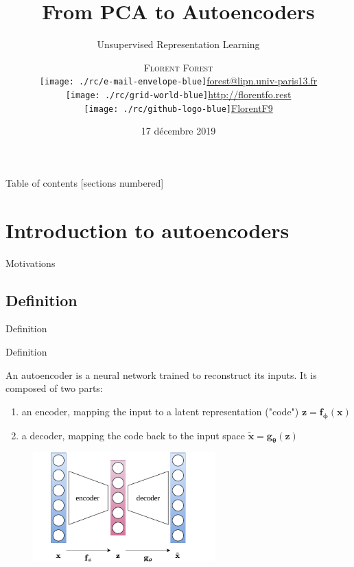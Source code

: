 \documentclass{beamer}
\title{From PCA to Autoencoders}
\subtitle{Unsupervised Representation Learning}
\date{17 décembre 2019}
\author{\textsc{Florent Forest}\vspace{0.2cm}\\
\texttt{[image: ./rc/e-mail-envelope-blue]}\;\scriptsize{\href{mailto:forest@lipn.univ-paris13.fr}{forest@lipn.univ-paris13.fr}}\\
\texttt{[image: ./rc/grid-world-blue]}\;\scriptsize{\href{http://florentfo.rest}{http://florentfo.rest}}\\
\texttt{[image: ./rc/github-logo-blue]}\;\scriptsize{\href{https://github.com/FlorentF9}{FlorentF9}}\\
}
\institute{\vfill\hfill
\texttt{[image: ./rc/logo\_supaero]}}
\begin{document}
  \maketitle

  \begin{frame}{Table of contents}
    [sections numbered]
      \tableofcontents%
  \end{frame}

  \section{Introduction to autoencoders}

  \begin{frame}{Motivations}

    \cite{Hinton2006}
    
  \end{frame}

  \subsection{Definition}

  \begin{frame}{Definition}


    \begin{exampleblock}{Definition}
      \small{
      An \alert{autoencoder} is a neural network trained to reconstruct its inputs. It is composed of two parts:
      \vspace{-0.4cm}
      \begin{enumerate}
        \item an \alert{encoder}, mapping the input to a latent representation ("code") $\mathbf{z} = \mathbf{f}_{\boldsymbol{\phi}}(\mathbf{x})$
        \item a \alert{decoder}, mapping the code back to the input space $\tilde{\mathbf{x}} = \mathbf{g}_{\boldsymbol{\theta}}(\mathbf{z})$
      \end{enumerate}
      }
    \end{exampleblock}
    \vspace{-0.25cm}
    \begin{figure}
      \includegraphics[width=7cm]{rc/autoencoder}
    \end{figure}

  \end{frame}
\end{document}
